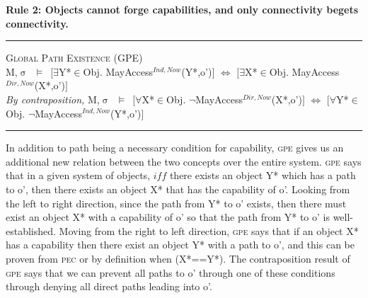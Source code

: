 \documentclass[a4paper,11pt, twoside,twocolumn]{article}
\newenvironment{logic}[1][]
{\begin{flushleft} \small }
{\end{flushleft}}
\newcommand{\loin}{$\in$}
\newcommand{\loforall}{$\forall$}
\newcommand{\loexists}{$\exists$}
\newcommand{\losigma}{$\upsigma$}
\newcommand{\loturns} {$\vDash$}
\newcommand{\loiff} {$\iff$}
\newcommand{\loneg}{$\boldsymbol \neg$}
\newcommand{\ablock} {\null\qquad}
\begin{document}
\textbf{Rule 2: Objects cannot forge capabilities, and only connectivity begets connectivity.}
\begin{logic}
\hrule\null
\textsc{\normalsize *Global Path Existence (GPE)}\\
M,\losigma\ \loturns\ $[$\loexists Y*\loin{Obj}. MayAccess$^{Ind,Now}$(Y*,o')$]$\linebreak
\ablock \loiff\linebreak
\ablock $[$\loexists X*\loin{Obj}. MayAccess$^{Dir,Now}$(X*,o')$]$
\linebreak\\
\textit{By contraposition,}\linebreak
M,\losigma\ \loturns\ $[$\loforall X*\loin{Obj}. \loneg MayAccess$^{Dir,Now}$(X*,o')$]$\linebreak
\ablock \loiff\linebreak
\ablock $[$\loforall Y*\loin{Obj}. \loneg MayAccess$^{Ind,Now}$(Y*,o')$]$\linebreak
\hrule
\end{logic}
In addition to path being a necessary condition for capability, \textsc{gpe} gives us an additional new relation between the two concepts over the entire system. \textsc{gpe} says that in a given system of objects, $iff$ there exists an object Y* which has a path to o', then there exists an object X* that has the capability of o'. Looking from the left to right direction, since the path from Y* to o' exists, then there must exist an object X* with a capability of o' so that the path from Y* to o' is well-established. Moving from the right to left direction, \textsc{gpe} says that if an object X* has a capability then there exist an object Y* with a path to o', and this can be proven from \textsc{pec} or by definition when (X*==Y*). The contraposition result of \textsc{gpe} says that we can prevent all paths to o' through one of these conditions through denying all direct paths leading into o'.\\
\end{document}

